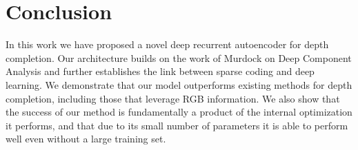 
\section{Conclusion}
\label{sec:conclusion}

In this work we have proposed a novel deep recurrent autoencoder for depth completion. Our architecture builds on the work of Murdock \etal on Deep Component Analysis and further establishes the link between sparse coding and deep learning. We demonstrate that our model outperforms existing methods for depth completion, including those that leverage RGB information. We also show that the success of our method is fundamentally a product of the internal optimization it performs, and that due to its small number of parameters it is able to perform well even without a large training set.\\